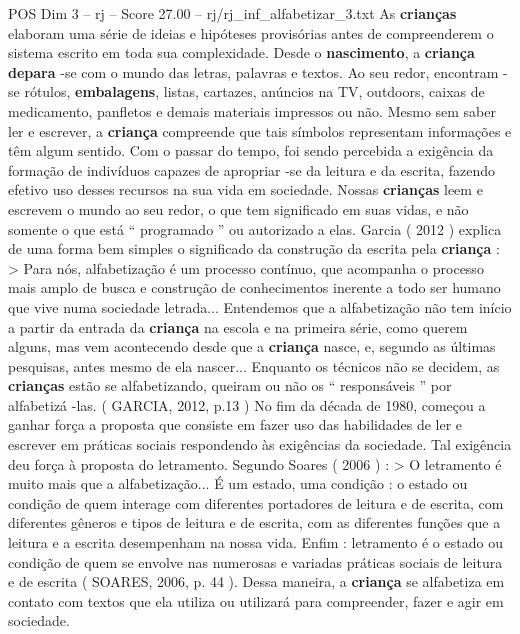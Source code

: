 \begin{textsample}{POS Dim 3 – rj – Score 27.00 – rj/rj\_inf\_alfabetizar\_3.txt}  \label{ex:f3_pos_003}
As \textbf{crianças} elaboram uma série de ideias e hipóteses provisórias antes de compreenderem o sistema escrito em toda sua complexidade.
Desde o \textbf{nascimento}, a \textbf{criança} \textbf{depara} -se com o mundo das letras, palavras e textos.
Ao seu redor, encontram -se rótulos, \textbf{embalagens}, listas, cartazes, anúncios na TV, outdoors, caixas de medicamento, panfletos e demais materiais impressos ou não.
Mesmo sem saber ler e escrever, a \textbf{criança} compreende que tais símbolos representam informações e têm algum sentido.
Com o passar do tempo, foi sendo percebida a exigência da formação de indivíduos capazes de apropriar -se da leitura e da escrita, fazendo efetivo uso desses recursos na sua vida em sociedade.
Nossas \textbf{crianças} leem e escrevem o mundo ao seu redor, o que tem significado em suas vidas, e não somente o que está “ programado ” ou autorizado a elas.
Garcia ( 2012 ) explica de uma forma bem simples o significado da construção da escrita pela \textbf{criança} : > Para nós, alfabetização é um processo contínuo, que acompanha o processo mais amplo de busca e construção de conhecimentos inerente a todo ser humano que vive numa sociedade letrada...
Entendemos que a alfabetização não tem início a partir da entrada da \textbf{criança} na escola e na primeira série, como querem alguns, mas vem acontecendo desde que a \textbf{criança} nasce, e, segundo as últimas pesquisas, antes mesmo de ela nascer...
Enquanto os técnicos não se decidem, as \textbf{crianças} estão se alfabetizando, queiram ou não os “ responsáveis ” por alfabetizá -las. ( GARCIA, 2012, p.13 ) No fim da década de 1980, começou a ganhar força a proposta que consiste em fazer uso das habilidades de ler e escrever em práticas sociais respondendo às exigências da sociedade.
Tal exigência deu força à proposta do letramento.
Segundo Soares ( 2006 ) : > O letramento é muito mais que a alfabetização...
É um estado, uma condição : o estado ou condição de quem interage com diferentes portadores de leitura e de escrita, com diferentes gêneros e tipos de leitura e de escrita, com as diferentes funções que a leitura e a escrita desempenham na nossa vida.
Enfim : letramento é o estado ou condição de quem se envolve nas numerosas e variadas práticas sociais de leitura e de escrita ( SOARES, 2006, p. 44 ).
Dessa maneira, a \textbf{criança} se alfabetiza em contato com textos que ela utiliza ou utilizará para compreender, fazer e agir em sociedade.

\end{textsample}
